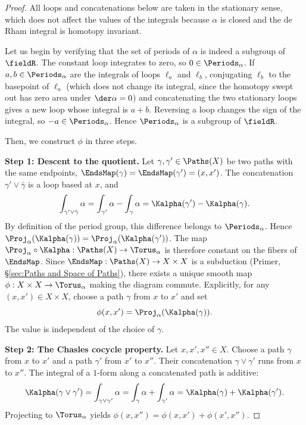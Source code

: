 \begin{proof}
  All loops and concatenations below are taken in the stationary sense,
  which does not affect the values of the integrals
  because $\alpha$ is closed and the de Rham integral is homotopy invariant.
  
  Let us begin by verifying that the set of periods of $\alpha$ is indeed a subgroup of $\fieldR$.
  The constant loop integrates to zero, so $0 \in \Periods_\alpha$.
  If $a,b \in \Periods_\alpha$ are the integrals of loops $\ell_a$ and $\ell_b$,
  conjugating $\ell_b$ to the basepoint of $\ell_a$ (which does not change
  its integral, since the homotopy swept out has zero area under $\der\alpha = 0$)
  and concatenating the two stationary loops
  gives a new loop whose integral is $a+b$.
  Reversing a loop changes the sign of the integral,
  so $-a \in \Periods_\alpha$.
  Hence $\Periods_\alpha$ is a subgroup of $\fieldR$.
  
  Then,
  we construct $\phi$ in three steps.
  
  \textbf{Step 1: Descent to the quotient.}
  Let $\gamma, \gamma' \in \Paths(X)$ be two paths with the same endpoints,
  $\EndsMap(\gamma) = \EndsMap(\gamma') = (x,x')$.
  The concatenation $\gamma' \vee \bar\gamma$ is a loop based at $x$,
  and
  \[
    \int_{\gamma' \vee \bar\gamma} \alpha
    = \int_{\gamma'} \alpha - \int_\gamma \alpha
    = \Kalpha(\gamma') - \Kalpha(\gamma).
    \]%
  By definition of the period group,
  this difference belongs to $\Periods_\alpha$.
  Hence $\Proj_\alpha(\Kalpha(\gamma)) = \Proj_\alpha(\Kalpha(\gamma'))$.
  The map $\Proj_\alpha \circ \Kalpha: \Paths(X) \to \Torus_\alpha$
  is therefore constant on the fibers of $\EndsMap$.
  Since $\EndsMap: \Paths(X) \to X \times X$ is a subduction
  (Primer, \S\ref{sec:Paths and Space of Paths}),
  there exists a unique smooth map $\phi: X \times X \to \Torus_\alpha$
  making the diagram commute.
  Explicitly,
  for any $(x,x') \in X \times X$,
  choose a path $\gamma$ from $x$ to $x'$ and set
  \[
    \phi(x,x') = \Proj_\alpha(\Kalpha(\gamma)).
    \]%
  The value is independent of the choice of $\gamma$.
  
  \textbf{Step 2: The Chasles cocycle property.}
  Let $x,x',x'' \in X$.
  Choose a path $\gamma$ from $x$ to $x'$ and a path $\gamma'$ from $x'$ to $x''$.
  Their concatenation $\gamma \vee \gamma'$ runs from $x$ to $x''$.
  The integral of a $1$-form along a concatenated path is additive:
  \[
    \Kalpha(\gamma \vee \gamma')
    = \int_{\gamma \vee \gamma'} \alpha
    = \int_\gamma \alpha + \int_{\gamma'} \alpha
    = \Kalpha(\gamma) + \Kalpha(\gamma').
    \]%
  Projecting to $\Torus_\alpha$ yields
  $\phi(x,x'') = \phi(x,x') + \phi(x',x'')$.
  

\end{proof}
